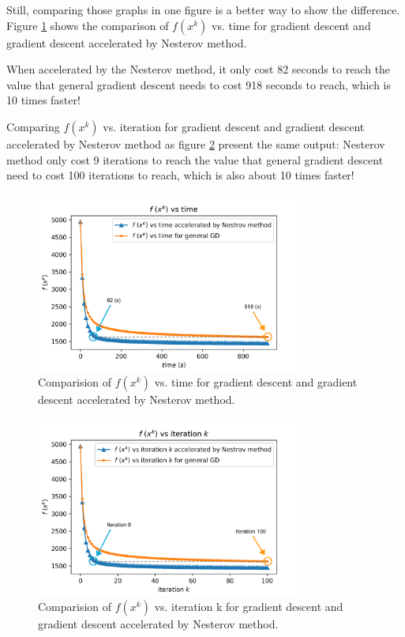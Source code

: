 \documentclass{article}
\begin{document}
Still, comparing those graphs in one figure is a better way to show the difference. Figure \ref{img14} shows the comparison of $f(x^{k})$ vs. time for gradient descent and gradient descent accelerated by Nesterov method. 

When accelerated by the Nesterov method, it only cost 82 seconds to reach the value that general gradient descent needs to cost 918 seconds to reach, which is 10 times faster! 

Comparing $f(x^{k})$ vs. iteration for gradient descent and gradient descent accelerated by Nesterov method as figure \ref{img15} present the same output: Nesterov method only cost 9 iterations to reach the value that general gradient descent need to cost 100 iterations to reach, which is also about 10 times faster! 

\begin{figure}[h]
  \includegraphics[width=3.5in]{pic14.png}
  \centering
  \caption{Comparision of $f(x^{k})$ vs. time for gradient descent and gradient descent accelerated by Nesterov method.}
  \label{img14}
\end{figure}

\begin{figure}[h]
  \includegraphics[width=3.5in]{pic15.png}
  \centering
  \caption{Comparision of $f(x^{k})$ vs. iteration k for gradient descent and gradient descent accelerated by Nesterov method.}
  \label{img15}
\end{figure}
\end{document}
